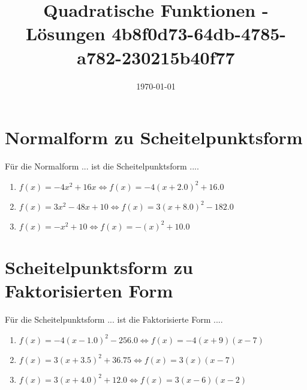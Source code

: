 \documentclass{article}%
\title{Quadratische Funktionen - Lösungen \newline 4b8f0d73-64db-4785-a782-230215b40f77}%
\date{\today}%
\begin{document}
%
\normalsize%
\maketitle%
\section{Normalform zu Scheitelpunktsform}%
\label{sec:NormalformzuScheitelpunktsform}%
Für die Normalform ... ist die Scheitelpunktsform ....%
\begin{enumerate}[label=\alph*)]%
\item%
\newline\vspace{0.5cm}$f(x)=-4x^2 + 16x\Leftrightarrow f(x)=-4(x+2.0)^2 +16.0$%
\item%
\newline\vspace{0.5cm}$f(x)=3x^2 - 48x + 10\Leftrightarrow f(x)=3(x+8.0)^2 -182.0$%
\item%
\newline\vspace{0.5cm}$f(x)=-x^2 + 10\Leftrightarrow f(x)=-(x)^2 +10.0$%
\end{enumerate}

%
\section{Scheitelpunktsform zu Faktorisierten Form}%
\label{sec:ScheitelpunktsformzuFaktorisiertenForm}%
Für die Scheitelpunktsform ... ist die Faktorisierte Form ....%
\begin{enumerate}[label=\alph*)]%
\item%
\newline\vspace{0.5cm}$f(x)=-4(x-1.0)^2 -256.0\Leftrightarrow f(x)=-4(x+9)(x-7)$%
\item%
\newline\vspace{0.5cm}$f(x)=3(x+3.5)^2 +36.75\Leftrightarrow f(x)=3(x)(x-7)$%
\item%
\newline\vspace{0.5cm}$f(x)=3(x+4.0)^2 +12.0\Leftrightarrow f(x)=3(x-6)(x-2)$%
\end{enumerate}

%
\end{document}
